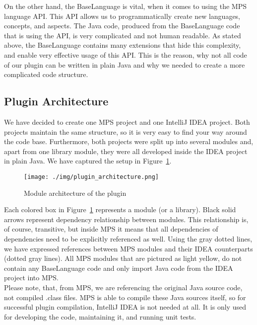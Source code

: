 On the other hand, the BaseLanguage is vital, when it comes to using the MPS language API.
This API allows us to programmatically create new languages, concepts, and aspects.
The Java code, produced from the BaseLanguage code that is using the API, is very complicated and not human readable.
As stated above, the BaseLanguage contains many extensions that hide this complexity, and enable very effective usage of this API.
This is the reason, why not all code of our plugin can be written in plain Java and why we needed to create a more complicated code structure.

\subsection{Plugin Architecture}

We have decided to create one MPS project and one IntelliJ IDEA project.
Both projects maintain the same structure, so it is very easy to find your way around the code base.
Furthermore, both projects were split up into several modules and, apart from one library module, they were all developed inside the IDEA project in plain Java.
We have captured the setup in Figure~\ref{fig:plugin_architecture}.

\begin{figure}[h]
	\centering
	\texttt{[image: ./img/plugin\_architecture.png]}
	\caption{Module architecture of the plugin}
	\label{fig:plugin_architecture}
\end{figure}

Each colored box in Figure~\ref{fig:plugin_architecture} represents a module (or a library).
Black solid arrows represent dependency relationship between modules.
This relationship is, of course, transitive, but inside MPS it means that all dependencies of dependencies need to be explicitly referenced as well.
Using the gray dotted lines, we have expressed references between MPS modules and their IDEA counterparts (dotted gray lines).
All MPS modules that are pictured as light yellow, do not contain any BaseLanguage code and only import Java code from the IDEA project into MPS.
\\

Please note, that, from MPS, we are referencing the original Java source code, not compiled .class files.
MPS is able to compile these Java sources itself, so for successful plugin compilation, IntelliJ IDEA is not needed at all.
It is only used for developing the code, maintaining it, and running unit tests.

